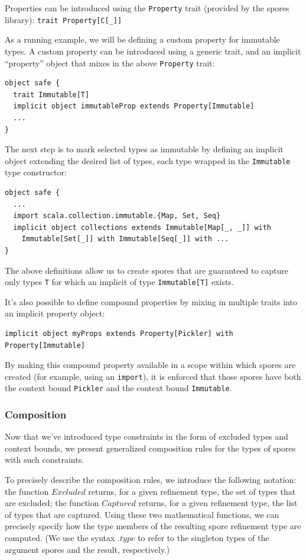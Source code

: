 \documentclass[runningheads]{llncs}
\begin{document}
\begin{sloppypar}
Properties can be introduced using the \verb|Property| trait (provided by the
spores library): \lstinline{trait Property[C[_]]}

As a running example, we will be defining a custom  property for
immutable types. A custom property can be introduced using a generic trait,
and an implicit ``property'' object that mixes in the above \verb|Property|
trait:

\begin{lstlisting}
object safe {
  trait Immutable[T]
  implicit object immutableProp extends Property[Immutable]
  ...
}
\end{lstlisting}
\noindent
The next step is to mark selected types as immutable by defining an implicit object extending the desired list of types, each type wrapped in the \verb|Immutable| type constructor:

\begin{lstlisting}
object safe {
  ...
  import scala.collection.immutable.{Map, Set, Seq}
  implicit object collections extends Immutable[Map[_, _]] with
    Immutable[Set[_]] with Immutable[Seq[_]] with ...
}
\end{lstlisting}

\noindent
The above definitions allow us to create spores that are guaranteed to capture
only types \verb|T| for which an implicit of type \verb|Immutable[T]| exists.

It's also possible to define compound properties by mixing in multiple traits
into an implicit property object:

\begin{lstlisting}[numbers=none]
implicit object myProps extends Property[Pickler] with Property[Immutable]
\end{lstlisting}
\noindent By making this compound property available in a scope within which spores are
created (for example, using an \verb|import|), it is enforced that those
spores have both the context bound \verb|Pickler| and the context bound
\verb|Immutable|.


\subsubsection{Composition}

Now that we've introduced type constraints in the form of excluded types and
context bounds, we present generalized composition rules for the types of
spores with such constraints.

To precisely describe the composition rules, we introduce the following
notation: the function $Excluded$ returns, for a given refinement type, the
set of types that are excluded; the function $Captured$ returns, for a given
refinement type, the list of types that are captured. Using these two
mathematical functions, we can precisely specify how the type members of the
resulting spore refinement type are computed. (We use the syntax $.type$
to refer to the singleton types of the argument spores and the result,
respectively.)


\end{sloppypar}
\end{document}

